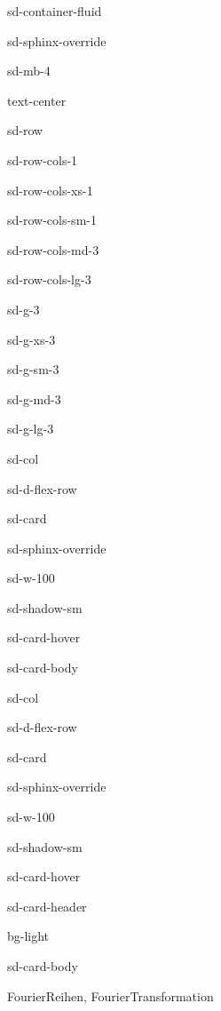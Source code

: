 \documentclass[letterpaper,10pt,english]{jupyterBook}
\let\sphinxpxdimen\pdfpxdimen\else\newdimen\sphinxpxdimen
\begin{document}
\begin{sphinxuseclass}{sd-container-fluid}
\begin{sphinxuseclass}{sd-sphinx-override}
\begin{sphinxuseclass}{sd-mb-4}
\begin{sphinxuseclass}{text-center}
\begin{sphinxuseclass}{sd-row}
\begin{sphinxuseclass}{sd-row-cols-1}
\begin{sphinxuseclass}{sd-row-cols-xs-1}
\begin{sphinxuseclass}{sd-row-cols-sm-1}
\begin{sphinxuseclass}{sd-row-cols-md-3}
\begin{sphinxuseclass}{sd-row-cols-lg-3}
\begin{sphinxuseclass}{sd-g-3}
\begin{sphinxuseclass}{sd-g-xs-3}
\begin{sphinxuseclass}{sd-g-sm-3}
\begin{sphinxuseclass}{sd-g-md-3}
\begin{sphinxuseclass}{sd-g-lg-3}
\begin{sphinxuseclass}{sd-col}
\begin{sphinxuseclass}{sd-d-flex-row}
\begin{sphinxuseclass}{sd-card}
\begin{sphinxuseclass}{sd-sphinx-override}
\begin{sphinxuseclass}{sd-w-100}
\begin{sphinxuseclass}{sd-shadow-sm}
\begin{sphinxuseclass}{sd-card-hover}
\begin{sphinxuseclass}{sd-card-body}
\end{sphinxuseclass}{\hyperref[\detokenize{content/3_Messsignale::doc}]{}}
\end{sphinxuseclass}
\end{sphinxuseclass}
\end{sphinxuseclass}
\end{sphinxuseclass}
\end{sphinxuseclass}
\end{sphinxuseclass}
\end{sphinxuseclass}
\begin{sphinxuseclass}{sd-col}
\begin{sphinxuseclass}{sd-d-flex-row}
\begin{sphinxuseclass}{sd-card}
\begin{sphinxuseclass}{sd-sphinx-override}
\begin{sphinxuseclass}{sd-w-100}
\begin{sphinxuseclass}{sd-shadow-sm}
\begin{sphinxuseclass}{sd-card-hover}
\begin{sphinxuseclass}{sd-card-header}
\begin{sphinxuseclass}{bg-light}
\sphinxAtStartPar
{}

\end{sphinxuseclass}
\end{sphinxuseclass}
\begin{sphinxuseclass}{sd-card-body}
\noindent\sphinxincludegraphics[height=120\sphinxpxdimen]{{messsignal_analog_diskret}.png}

\sphinxAtStartPar
Fourier\sphinxhyphen{}Reihen, Fourier\sphinxhyphen{}Transformation


\end{sphinxuseclass}
\end{sphinxuseclass}
\end{sphinxuseclass}
\end{sphinxuseclass}
\end{sphinxuseclass}
\end{sphinxuseclass}
\end{sphinxuseclass}
\end{sphinxuseclass}
\end{sphinxuseclass}
\end{sphinxuseclass}
\end{sphinxuseclass}
\end{sphinxuseclass}
\end{sphinxuseclass}
\end{sphinxuseclass}
\end{sphinxuseclass}
\end{sphinxuseclass}
\end{sphinxuseclass}
\end{sphinxuseclass}
\end{sphinxuseclass}
\end{sphinxuseclass}
\end{sphinxuseclass}
\end{sphinxuseclass}
\end{sphinxuseclass}
\end{document}
